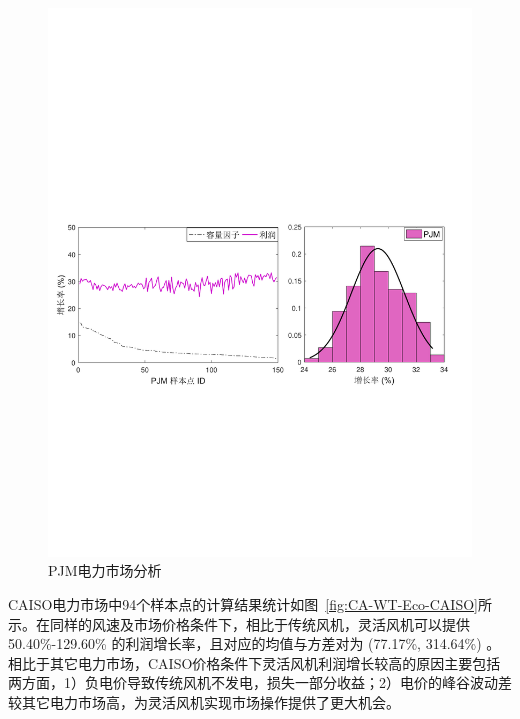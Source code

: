\begin{figure}[H] %
  \centering
  \includegraphics[scale=0.70]{figures/Chap5-20-CA-WT-Eco-PJM.pdf}
  \caption{PJM电力市场分析}
  \label{fig:CA-WT-Eco-PJM}
\end{figure}

CAISO电力市场中94个样本点的计算结果统计如图~\ref{fig:CA-WT-Eco-CAISO}所示。在同样的风速及市场价格条件下，相比于传统风机，灵活风机可以提供 50.40\%-129.60\% 的利润增长率，且对应的均值与方差对为 (77.17\%, 314.64\%) 。相比于其它电力市场，CAISO价格条件下灵活风机利润增长较高的原因主要包括两方面，1）负电价导致传统风机不发电，损失一部分收益；2）电价的峰谷波动差较其它电力市场高，为灵活风机实现市场操作提供了更大机会。

